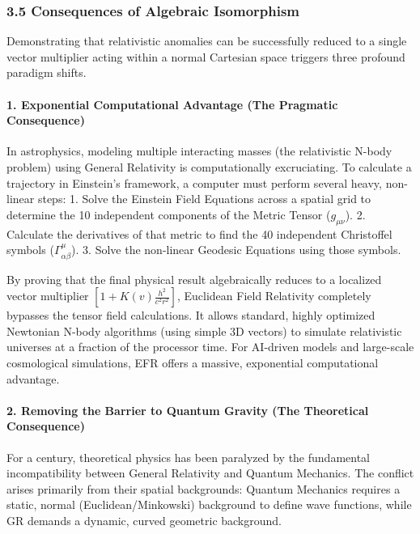 \documentclass[
]{article}
\begin{document}
\subsubsection{3.5 Consequences of Algebraic
Isomorphism}\label{consequences-of-algebraic-isomorphism}

Demonstrating that relativistic anomalies can be successfully reduced to
a single vector multiplier acting within a normal Cartesian space
triggers three profound paradigm shifts.

\paragraph{1. Exponential Computational Advantage (The Pragmatic
Consequence)}\label{exponential-computational-advantage-the-pragmatic-consequence}

In astrophysics, modeling multiple interacting masses (the relativistic
N-body problem) using General Relativity is computationally
excruciating. To calculate a trajectory in Einstein's framework, a
computer must perform several heavy, non-linear steps: 1. Solve the
Einstein Field Equations across a spatial grid to determine the 10
independent components of the Metric Tensor (\(g_{\mu\nu}\)). 2.
Calculate the derivatives of that metric to find the 40 independent
Christoffel symbols (\(\Gamma^{\mu}_{\alpha\beta}\)). 3. Solve the
non-linear Geodesic Equations using those symbols.

By proving that the final physical result algebraically reduces to a
localized vector multiplier
\(\left[ 1 + K(v) \frac{h^2}{c^2 r^2} \right]\), Euclidean Field
Relativity completely bypasses the tensor field calculations. It allows
standard, highly optimized Newtonian N-body algorithms (using simple 3D
vectors) to simulate relativistic universes at a fraction of the
processor time. For AI-driven models and large-scale cosmological
simulations, EFR offers a massive, exponential computational advantage.

\paragraph{2. Removing the Barrier to Quantum Gravity (The Theoretical
Consequence)}\label{removing-the-barrier-to-quantum-gravity-the-theoretical-consequence}

For a century, theoretical physics has been paralyzed by the fundamental
incompatibility between General Relativity and Quantum Mechanics. The
conflict arises primarily from their spatial backgrounds: Quantum
Mechanics requires a static, normal (Euclidean/Minkowski) background to
define wave functions, while GR demands a dynamic, curved geometric
background.
\end{document}
